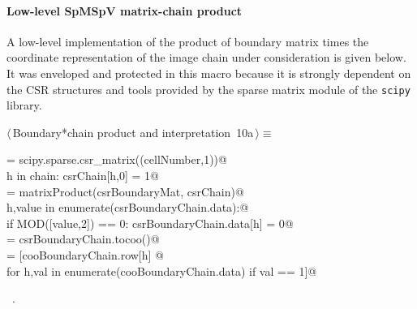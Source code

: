 \documentclass[11pt,oneside]{article}	%
\begin{document}
\paragraph{Low-level SpMSpV matrix-chain product}

A low-level implementation of the product of boundary matrix times the coordinate representation of the image chain under consideration is given below. It was enveloped and protected in this macro because it is strongly dependent on the CSR structures and tools provided by the sparse matrix module of the \texttt{scipy} library.	

\begin{flushleft} \small
\begin{minipage}{\linewidth} \label{scrap15}
\protect{}$\langle\,$Boundary*chain product and interpretation\nobreak\ {\footnotesize 10a}$\,\rangle\equiv$
\vspace{-1ex}
\begin{list}{}{} \item
\mbox{}\verb@csrChain = scipy.sparse.csr_matrix((cellNumber,1))@\\
\mbox{}\verb@for h in chain: csrChain[h,0] = 1@\\
\mbox{}\verb@csrBoundaryChain = matrixProduct(csrBoundaryMat, csrChain)@\\
\mbox{}\verb@for h,value in enumerate(csrBoundaryChain.data):@\\
\mbox{}\verb@   if MOD([value,2]) == 0: csrBoundaryChain.data[h] = 0@\\
\mbox{}\verb@cooBoundaryChain = csrBoundaryChain.tocoo()@\\
\mbox{}\verb@boundaryChain = [cooBoundaryChain.row[h] @\\
\mbox{}\verb@   for h,val in enumerate(cooBoundaryChain.data) if val == 1]@\\
\mbox{}\verb@@{\NWsep}
\end{list}
\vspace{-1ex}
\footnotesize\addtolength{\baselineskip}{-1ex}
\begin{list}{}{\setlength{\itemsep}{-\parsep}\setlength{\itemindent}{-\leftmargin}}
\item \NWtxtMacroRefIn\ .
\end{list}
\end{minipage}\\[4ex]
\end{flushleft}
\end{document}

